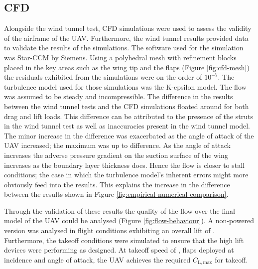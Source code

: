 \documentclass[../../main.tex]{subfiles}
\begin{document}
\subsection{CFD} \label{sec:project-review:testing-and-evaluation:cfd}

Alongside the wind tunnel test, CFD simulations were used to assess the validity of the airframe of the UAV.
Furthermore, the wind tunnel results provided data to validate the results of the simulations.
The software used for the simulation was Star-CCM by Siemens.
Using a polyhedral mesh with refinement blocks placed in the key areas such as the wing tip and the flaps (Figure \ref{fig:cfd-mesh}) the residuals exhibited from the simulations were on the order of $10^{-7}$.
The turbulence model used for those simulations was the K-epsilon model.
The flow was assumed to be steady and incompressible.
The difference in the results between the wind tunnel tests and the CFD simulations floated around  for both drag and lift loads.
This difference can be attributed to the presence of the struts in the wind tunnel test as well as inaccuracies present in the wind tunnel model.
The minor increase in the difference was exacerbated as the angle of attack of the UAV increased; the maximum was up to  difference.
As the angle of attack increases the adverse pressure gradient on the suction surface of the wing increases as the boundary layer thickness does.
Hence the flow is closer to stall conditions; the case in which the turbulence model's inherent errors might more obviously feed into the results.
This explains the increase in the difference between the results shown in Figure \ref{fig:empirical-numerical-comparison}. 


Through the validation of these results the quality of the flow over the final model of the UAV could be analysed (Figure \ref{fig:flow-behaviour}).
A non-powered version was analysed in flight conditions exhibiting an overall lift of .
Furthermore, the takeoff conditions were simulated to ensure that the high lift devices were performing as designed.
At takeoff speed of , flaps deployed at  incidence and  angle of attack, the UAV achieves the required $C_\mathrm{L,max}$ for takeoff. 

\end{document}
